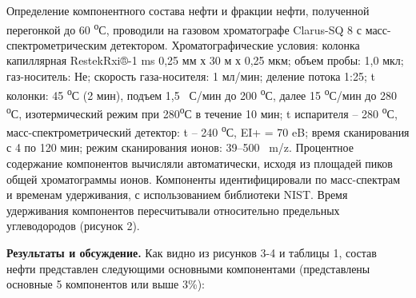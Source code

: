 \begin{multicols}{2}
Определение компонентного состава нефти и фракции нефти, полученной
перегонкой до 60 \textsuperscript{о}С, проводили на газовом хроматографе
Clarus-SQ 8 с масс-спектрометрическим детектором. Хроматографические
условия: колонка капиллярная RestekRxi®-1 ms 0,25 мм х 30 м х 0,25 мкм;
объем пробы: 1,0 мкл; газ-носитель: Не; скорость газа-носителя: 1
мл/мин; деление потока 1:25; t колонки: 45 \textsuperscript{о}С (2 мин),
подъем 1,5 ~С/мин до 200 \textsuperscript{о}С, далее 15
\textsuperscript{о}С/мин до 280 \textsuperscript{о}С, изотермический
режим при 280\textsuperscript{о}С в течение 10 мин; t испарителя -- 280
\textsuperscript{о}С, масс-спектрометрический детектор: t -- 240
\textsuperscript{о}С, EI+ = 70 eB; время сканирования с 4 по 120 мин;
режим сканирования ионов: 39--500 ~m/z. Процентное содержание
компонентов вычисляли автоматически, исходя из площадей пиков общей
хроматограммы ионов. Компоненты идентифицировали по масс-спектрам и
временам удерживания, с использованием библиотеки NIST. Время
удерживания компонентов пересчитывали относительно предельных
углеводородов (рисунок 2).
\end{multicols}

% 
% 

{\bfseries Результаты и обсуждение.} Как видно из рисунков 3-4 и таблицы 1,
состав нефти представлен следующими основными компонентами (представлены
основные 5 компонентов или выше 3\%):

